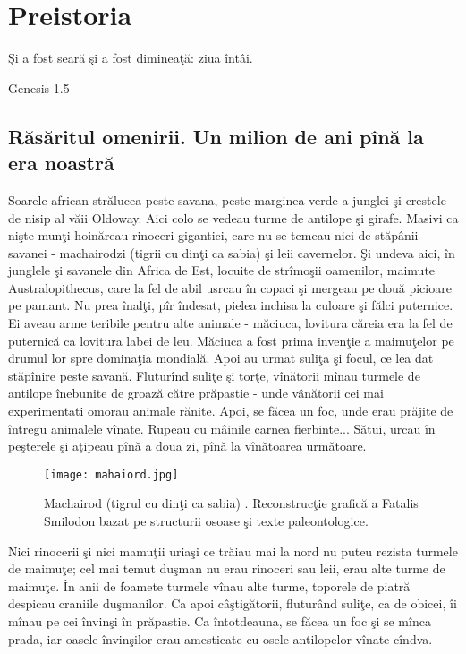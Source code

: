 
\chapter{Preistoria}
\epigraph{Şi a fost seară şi a fost dimineaţă: ziua întâi.}{Genesis 1.5}
\section{Răsăritul omenirii. Un milion de ani pînă la era noastră}
Soarele african strălucea peste savana, peste marginea verde a junglei şi crestele de nisip al văii Oldoway. Aici colo se vedeau turme de antilope şi girafe. Masivi ca nişte munţi hoinăreau rinoceri gigantici, care nu se temeau nici de stăpânii savanei - machairodzi (tigrii cu dinţi ca sabia) şi leii cavernelor. Şi undeva aici, în junglele şi savanele din Africa de Est, locuite de strîmoşii oamenilor, maimute Australopithecus, care la fel de abil usrcau în copaci şi mergeau pe două picioare pe pamant. Nu prea înalţi, pîr îndesat, pielea inchisa la culoare şi fălci puternice. Ei aveau arme teribile pentru alte animale - măciuca, lovitura căreia era la fel de puternică ca lovitura labei de leu. Măciuca a fost prima invenţie a maimuţelor pe drumul lor spre dominaţia mondială. Apoi au urmat suliţa şi focul, ce lea dat stăpînire peste savană. Fluturînd suliţe şi torţe, vînătorii mînau turmele de antilope înebunite de groază către prăpastie - unde vânătorii cei mai experimentati omorau animale rănite. Apoi, se făcea un foc, unde erau prăjite de întregu animalele vînate. Rupeau cu mâinile carnea fierbinte... Sătui, urcau în peşterele şi aţipeau pînă a doua zi, pînă la vînătoarea următoare. 
\begin{wrapfigure}[10]{r}{0.3\linewidth} 
    \texttt{[image: mahaiord.jpg]}
    \caption{Machairod (tigrul cu dinţi ca sabia) . Reconstrucţie grafică a Fatalis Smilodon bazat pe structurii osoase şi texte paleontologice.}
    \label{fig:pca}
\end{wrapfigure}

Nici rinocerii şi nici mamuţii uriaşi ce trăiau mai la nord nu puteu rezista turmele de maimuţe; cel mai temut duşman nu erau rinoceri sau leii, erau alte turme de maimuţe. În anii de foamete turmele vînau alte turme, toporele de piatră despicau craniile duşmanilor. Ca apoi câştigătorii, fluturând suliţe, ca de obicei, îi mînau pe cei învinşi în prăpastie. Ca întotdeauna, se făcea un foc şi se mînca prada, iar oasele învinşilor erau amesticate cu osele antilopelor vînate cîndva. 


